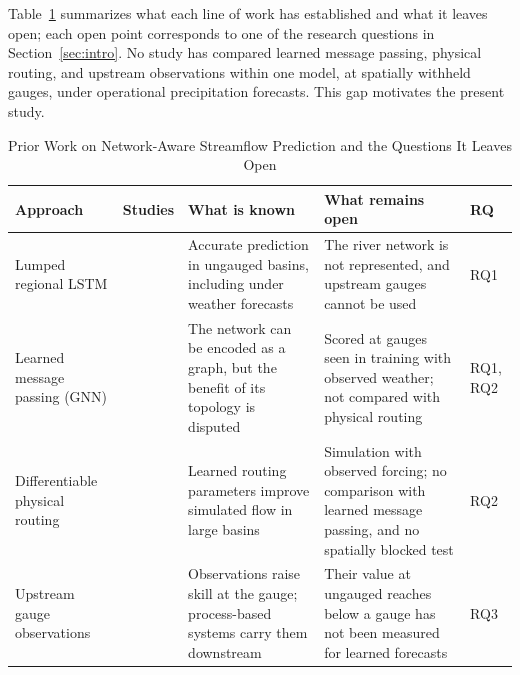 \documentclass[draft]{agujournal2019}
\begin{document}
Table~\ref{tab:related} summarizes what each line of work has established and what it leaves open; each open point corresponds to one of the research questions in Section~\ref{sec:intro}. No study has compared learned message passing, physical routing, and upstream observations within one model, at spatially withheld gauges, under operational precipitation forecasts. This gap motivates the present study.


\begin{table}
\caption{Prior Work on Network-Aware Streamflow Prediction and the Questions It Leaves Open}
\label{tab:related}
\footnotesize
\setlength{\parindent}{0pt}
\renewcommand{\arraystretch}{1.3}
\setlength{\tabcolsep}{3pt}
\begin{tabular}{@{}>{\raggedright\arraybackslash}p{} >{\raggedright\arraybackslash}p{} >{\raggedright\arraybackslash}p{} >{\raggedright\arraybackslash}p{} >{\raggedright\arraybackslash}p{}@{}}
\toprule
\textbf{Approach} & \textbf{Studies} & \textbf{What is known} & \textbf{What remains open} & \textbf{RQ} \\
\midrule
Lumped regional LSTM &
\cite{Kratzert2019wrr,Nearing2024} &
Accurate prediction in ungauged basins, including under weather forecasts &
The river network is not represented, and upstream gauges cannot be used &
RQ1 \\
\addlinespace
Learned message passing (GNN) &
\cite{Jia2021,Sun2022,Kirschstein2024,WangH2025,Mosaffa2026} &
The network can be encoded as a graph, but the benefit of its topology is disputed &
Scored at gauges seen in training with observed weather; not compared with physical routing &
RQ1, RQ2 \\
\addlinespace
Differentiable physical routing &
\cite{Bindas2024,Song2025} &
Learned routing parameters improve simulated flow in large basins &
Simulation with observed forcing; no comparison with learned message passing, and no spatially blocked test &
RQ2 \\
\addlinespace
Upstream gauge observations &
\cite{Feng2020,Nearing2022,Cosgrove2024} &
Observations raise skill at the gauge; process-based systems carry them downstream &
Their value at ungauged reaches below a gauge has not been measured for learned forecasts &
RQ3 \\
\bottomrule
\end{tabular}
\end{table}
\end{document}

